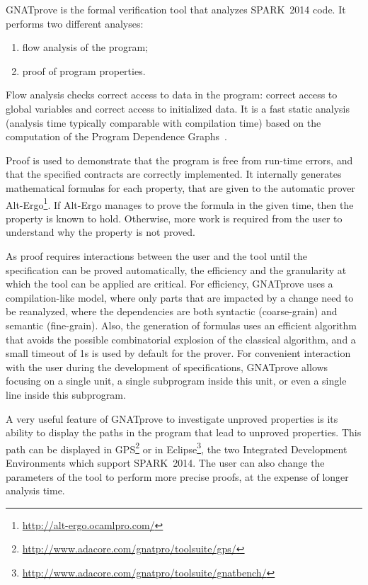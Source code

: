 \documentclass[10pt,a4paper,twocolumn]{article}
\newcommand{\gnatprove}{GNATprove\xspace}
\newcommand{\newspark}{SPARK~2014\xspace}
\newcommand{\altergo}{Alt-Ergo\xspace}
\begin{document}
\gnatprove is the formal verification tool that analyzes \newspark code. It
performs two different analyses:

\begin{enumerate}
\item flow analysis of the program;
\item proof of program properties.
\end{enumerate}

Flow analysis checks correct access to data in the program: correct access to
global variables
and correct
access to initialized data. It is a fast static analysis (analysis time
typically comparable with compilation time) based on the computation of the
Program Dependence Graphs~\cite{Horwitz:1988:ISU:53990.53994}.

Proof is used to demonstrate that the program is free from run-time errors, and
that the specified contracts are correctly implemented. It internally generates
mathematical formulas for each property, that are given to the automatic prover
\altergo\footnote{\url{http://alt-ergo.ocamlpro.com/}}. If \altergo manages to
prove the formula in the given time, then the property is known to
hold. Otherwise, more work is required from the user to understand why the
property is not proved.

As proof requires interactions between the user and the tool until the
specification can be proved automatically, the efficiency and the granularity
at which the tool can be applied are critical. For efficiency, \gnatprove uses
a compilation-like model, where only parts that are impacted by a change need
to be reanalyzed, where the dependencies are both syntactic (coarse-grain) and
semantic (fine-grain). Also, the generation of formulas uses an efficient
algorithm~\cite{leino:2005:ipl} that avoids the possible combinatorial
explosion of the classical algorithm, and a small timeout of 1s is used by
default for the prover. For convenient interaction with the user during the
development of specifications, \gnatprove allows focusing on a single unit, a
single subprogram inside this unit, or even a single line inside this
subprogram.

A very useful feature of \gnatprove to investigate unproved properties is its
ability to display the paths in the program that lead to unproved
properties. This path can be displayed in
GPS\footnote{\url{http://www.adacore.com/gnatpro/toolsuite/gps/}} or in
Eclipse\footnote{\url{http://www.adacore.com/gnatpro/toolsuite/gnatbench/}},
the two Integrated Development Environments which support \newspark. The user
can also change the parameters of the tool to perform more precise proofs, at
the expense of longer analysis time.
\end{document}
